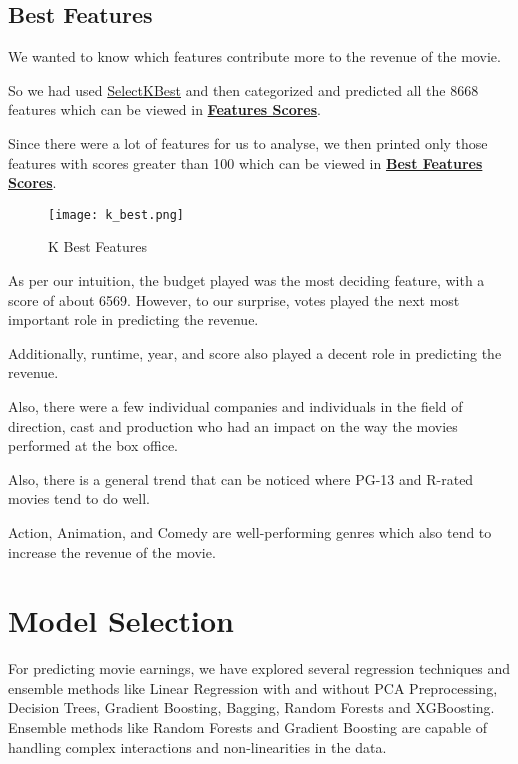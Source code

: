 \documentclass[conference]{IEEEtran}
\begin{document}
        \subsection*{Best Features}
            We wanted to know which features contribute more to the revenue of the movie.

            So we had used \href{https://scikit-learn.org/stable/modules/generated/sklearn.feature_selection.SelectKBest.html}{SelectKBest} and then categorized and predicted all the 8668 features which can be viewed in \href{https://github.com/Vikranth3140/Movie-Revenue-Prediction/blob/main/Helper%20files/Best%20Festures/feature_scores.txt}{\textbf{Features Scores}}.

            Since there were a lot of features for us to analyse, we then printed only those features with scores greater than 100 which can be viewed in \href{https://github.com/Vikranth3140/Movie-Revenue-Prediction/blob/main/Helper%20files/Best%20Festures/significant_features.txt}{\textbf{Best Features Scores}}.

            \begin{figure}[H]
                \centering
                \texttt{[image: k\_best.png]}
                \caption{K Best Features}
                \label{fig:k-best}
            \end{figure}

            As per our intuition, the budget played was the most deciding feature, with a score of about 6569.
            However, to our surprise, votes played the next most important role in predicting the revenue.

            Additionally, runtime, year, and score also played a decent role in predicting the revenue.

            Also, there were a few individual companies and individuals in the field of direction, cast and production who had an impact on the way the movies performed at the box office.

            Also, there is a general trend that can be noticed where PG-13 and R-rated movies tend to do well.

            Action, Animation, and Comedy are well-performing genres which also tend to increase the revenue of the movie.

\section{Model Selection}
    For predicting movie earnings, we have explored several regression techniques and ensemble methods like Linear Regression with and without PCA Preprocessing, Decision Trees, Gradient Boosting, Bagging, Random Forests and XGBoosting.
    Ensemble methods like Random Forests and Gradient Boosting are capable of handling complex interactions and non-linearities in the data.
\end{document}
